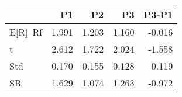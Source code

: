 \begin{tabular}{lrrrr}
\toprule
 & P1 & P2 & P3 & P3-P1 \\
\midrule
E[R]--Rf & 1.991 & 1.203 & 1.160 & -0.016 \\
t & 2.612 & 1.722 & 2.024 & -1.558 \\
Std & 0.170 & 0.155 & 0.128 & 0.119 \\
SR & 1.629 & 1.074 & 1.263 & -0.972 \\
\bottomrule
\end{tabular}
